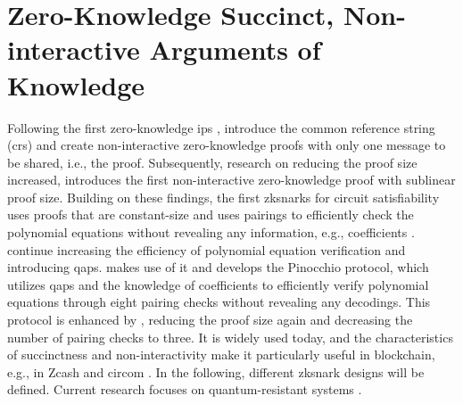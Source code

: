 \section{Zero-Knowledge Succinct, Non-interactive Arguments of Knowledge}
Following the first zero-knowledge \acrshort{ip}s \citep{GoldwasserIPs}, \citet{Blum1991} introduce the common reference string (\acrshort{crs}) and create non-interactive zero-knowledge proofs with only one message to be shared, i.e., the proof. Subsequently, research on reducing the proof size increased, \citet{MicaliArgSys} introduces the first non-interactive zero-knowledge proof with sublinear proof size. Building on these findings, the first \acrshort{zksnark}s for circuit satisfiability uses proofs that are constant-size and uses pairings to efficiently check the polynomial equations without revealing any information, e.g., coefficients \citep{Groth2010ShortPN}. \citet{GennaroLinPCP} continue increasing the efficiency of polynomial equation verification and introducing \acrshort{qap}s. \citet{Pinocchio} makes use of it and develops the Pinocchio protocol, which utilizes \acrshort{qap}s and the knowledge of coefficients to efficiently verify polynomial equations through eight pairing checks without revealing any decodings. This protocol is enhanced by \citet{Groth2016OnTS}, reducing the proof size again and decreasing the number of pairing checks to three. It is widely used today, and the characteristics of succinctness and non-interactivity make it particularly useful in blockchain, e.g., in Zcash and circom \citep{chen2022review}. In the following, different \acrshort{zksnark} designs will be defined. Current research focuses on quantum-resistant systems \citep{chen2022review}.

